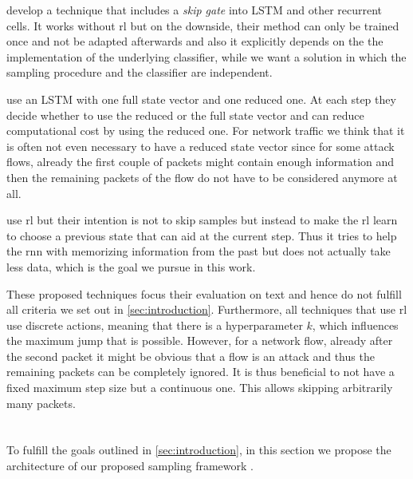\documentclass[conference]{IEEEtran}
\begin{document}
\cite{campos_skip_2018} develop a technique that includes a \textit{skip gate} into LSTM and other recurrent cells. It works without \gls{rl} but on the downside, their method can only be trained once and not be adapted afterwards and also it explicitly depends on the the implementation of the underlying classifier, while we want a solution in which the sampling procedure and the classifier are independent.

\cite{seo_neural_2018} use an LSTM with one full state vector and one reduced one. At each step they decide whether to use the reduced or the full state vector and can reduce computational cost by using the reduced one. For network traffic we think that it is often not even necessary to have a reduced state vector since for some attack flows, already the first couple of packets might contain enough information and then the remaining packets of the flow do not have to be considered anymore at all.

\cite{gui_long_2018} use \gls{rl} but their intention is not to skip samples but instead to make the \gls{rl} learn to choose a previous state that can aid at the current step. Thus it tries to help the \gls{rnn} with memorizing information from the past but does not actually take less data, which is the goal we pursue in this work.

These proposed techniques focus their evaluation on text and hence do not fulfill all criteria we set out in \autoref{sec:introduction}. Furthermore, all techniques that use \gls{rl} use discrete actions, meaning that there is a hyperparameter $k$, which influences the maximum jump that is possible. However, for a network flow, already after the second packet it might be obvious that a flow is an attack and thus the remaining packets can be completely ignored. It is thus beneficial to not have a fixed maximum step size but a continuous one. This allows skipping arbitrarily many packets.


\section{\ours{}}

To fulfill the goals outlined in \autoref{sec:introduction}, in this section we propose the architecture of our proposed sampling framework \ours.
\end{document}
